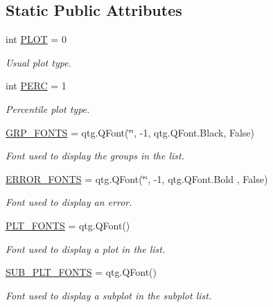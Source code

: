 \subsection*{Static Public Attributes}
\begin{DoxyCompactItemize}
\item 
int \hyperlink{classDQN-Deepmind-NIPS-2013_1_1Plotter_1_1Plotter_a0ed150721300639b6230824109f7427b}{P\+L\+OT} = 0
\begin{DoxyCompactList}\small\item\em Usual plot type. \end{DoxyCompactList}\item 
int \hyperlink{classDQN-Deepmind-NIPS-2013_1_1Plotter_1_1Plotter_a1f89ddbef8de94b70bfce1c5c6427b4b}{P\+E\+RC} = 1
\begin{DoxyCompactList}\small\item\em Percentile plot type. \end{DoxyCompactList}\item 
\hyperlink{classDQN-Deepmind-NIPS-2013_1_1Plotter_1_1Plotter_ac731a7755fab8cf0958411b81af56f55}{G\+R\+P\+\_\+\+F\+O\+N\+TS} = qtg.\+Q\+Font(\char`\"{}\char`\"{}, -\/1, qtg.\+Q\+Font.\+Black, False)
\begin{DoxyCompactList}\small\item\em Font used to display the groups in the list. \end{DoxyCompactList}\item 
\hyperlink{classDQN-Deepmind-NIPS-2013_1_1Plotter_1_1Plotter_a526f4f1265860b0186b6232689de6335}{E\+R\+R\+O\+R\+\_\+\+F\+O\+N\+TS} = qtg.\+Q\+Font(\char`\"{}\char`\"{}, -\/1, qtg.\+Q\+Font.\+Bold , False)
\begin{DoxyCompactList}\small\item\em Font used to display an error. \end{DoxyCompactList}\item 
\hyperlink{classDQN-Deepmind-NIPS-2013_1_1Plotter_1_1Plotter_a6b90920063b98d9487ba14c48f5af362}{P\+L\+T\+\_\+\+F\+O\+N\+TS} = qtg.\+Q\+Font()
\begin{DoxyCompactList}\small\item\em Font used to display a plot in the list. \end{DoxyCompactList}\item 
\hyperlink{classDQN-Deepmind-NIPS-2013_1_1Plotter_1_1Plotter_a9e65187d496ef975f211f37ec66f77b0}{S\+U\+B\+\_\+\+P\+L\+T\+\_\+\+F\+O\+N\+TS} = qtg.\+Q\+Font()
\begin{DoxyCompactList}\small\item\em Font used to display a subplot in the subplot list. \end{DoxyCompactList}\item 

\end{DoxyCompactItemize}
